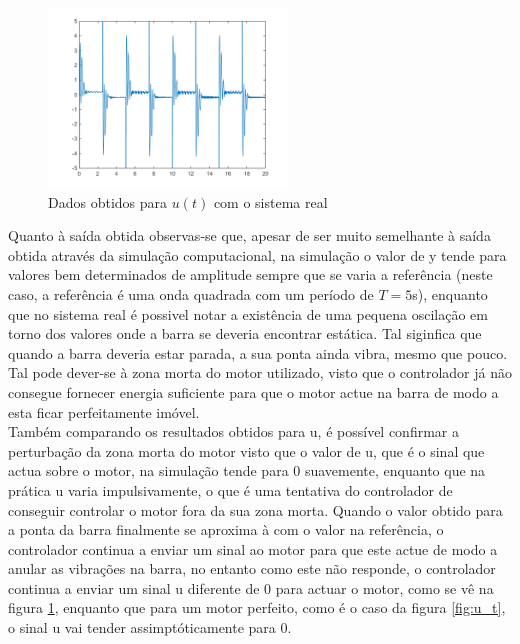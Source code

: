 \documentclass[%
  reprint,
  nofootinbib,
  amsmath,amssymb,
  aps,
  10pt,
  a4paper
]{revtex4-1}
\begin{document}
\begin{figure}
\includegraphics[width=2.5in]{../img/u_dados_01.png}
\caption{Dados obtidos para $u(t)$ com o sistema real}
\label{fig:u_d}
\end{figure}
Quanto à saída obtida observas-se que, apesar de ser muito semelhante à saída obtida através da simulação computacional, na simulação o valor de y tende para valores bem determinados de amplitude sempre que se varia a referência (neste caso, a referência é uma onda quadrada com um período de $T=5$s), enquanto que no sistema real é possivel notar a existência de uma pequena oscilação em torno dos valores onde a barra se deveria encontrar estática. Tal siginfica que quando a barra deveria estar parada, a sua ponta ainda vibra, mesmo que pouco. Tal pode dever-se à zona morta do motor utilizado, visto que o controlador já não consegue fornecer energia suficiente para que o motor actue na barra de modo a esta ficar perfeitamente imóvel.\\
Também comparando os resultados obtidos para u, é possível confirmar a perturbação da zona morta do motor visto que o valor de u, que é o sinal que actua sobre o motor,  na simulação tende para 0 suavemente, enquanto que na prática u varia impulsivamente, o que é uma tentativa do controlador de conseguir controlar o motor fora da sua zona morta. Quando o valor obtido para a ponta da barra finalmente se aproxima à com o valor na referência, o controlador continua a enviar um sinal ao motor para que este actue de modo a anular as vibrações na barra, no entanto como este não responde, o controlador continua a enviar um  sinal u diferente de 0 para actuar o motor, como se vê na figura \ref{fig:u_d}, enquanto que para um motor perfeito, como é o caso da figura \ref{fig:u_t}, o sinal u vai tender assimptóticamente para 0.
\end{document}
